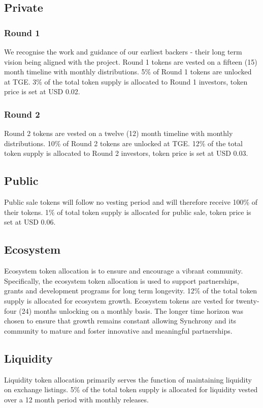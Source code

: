 \documentclass[10pt]{article}
\begin{document}
					\subsection{Private}
					\subsubsection{Round 1}
					We recognise the work and guidance of our earliest backers - their long term
					vision being aligned with the project. Round 1 tokens are vested on a fifteen
					(15) month timeline with monthly distributions. 5\% of Round 1 tokens are
					unlocked at TGE. 3\% of the total token supply is allocated to Round
					1 investors, token price is set at USD 0.02.

					\subsubsection{Round 2}
					Round 2 tokens are vested on a twelve (12) month timeline with monthly
					distributions. 10\% of Round 2 tokens are unlocked at TGE. 12\% of the total
					token supply is allocated to Round 2 investors, token price is set at USD 0.03.

					\subsection{Public}
					Public sale tokens will follow no vesting period and will therefore receive
					100\% of their tokens. 1\% of total token supply is allocated for public sale,
					token price is set at USD 0.06.

					\subsection{Ecosystem}
					Ecosystem token allocation is to ensure and encourage a vibrant community.
					Specifically, the ecosystem token allocation is used to support partnerships,
					grants and development programs for long term longevity. 12\% of the total token
					supply is allocated for ecosystem growth. Ecosystem tokens are vested for
					twenty-four (24) months unlocking on a monthly basis. The longer time horizon
					was chosen to ensure that growth remains constant allowing Synchrony and its
					community to mature and foster innovative and meaningful partnerships.

					\subsection{Liquidity}
					Liquidity token allocation primarily serves the function of maintaining
					liquidity on exchange listings. 5\% of the total token supply is allocated for
					liquidity vested over a 12 month period with monthly releases.
\end{document}
